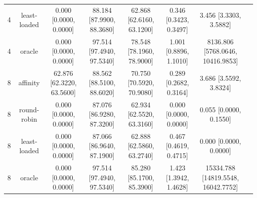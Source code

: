 \begin{table}[t]
\begin{tabular}{lccccccc}
4 & least-loaded & 0.000 \tiny [0.0000, 0.0000] & 88.184 \tiny [87.9900, 88.3680] & 62.868 \tiny [62.6160, 63.1200] & 0.346 \tiny [0.3423, 0.3497] & 3.456 \tiny [3.3303, 3.5882] \\
4 & oracle & 0.000 \tiny [0.0000, 0.0000] & 97.514 \tiny [97.4940, 97.5340] & 78.548 \tiny [78.1960, 78.9000] & 1.001 \tiny [0.8896, 1.1010] & 8136.806 \tiny [5768.0646, 10416.9853] \\
8 & affinity & 62.876 \tiny [62.3220, 63.5600] & 88.562 \tiny [88.5100, 88.6020] & 70.750 \tiny [70.5920, 70.9080] & 0.289 \tiny [0.2682, 0.3164] & 3.686 \tiny [3.5592, 3.8324] \\
8 & round-robin & 0.000 \tiny [0.0000, 0.0000] & 87.076 \tiny [86.9280, 87.3200] & 62.934 \tiny [62.5520, 63.3160] & 0.000 \tiny [0.0000, 0.0000] & 0.055 \tiny [0.0000, 0.1550] \\
8 & least-loaded & 0.000 \tiny [0.0000, 0.0000] & 87.066 \tiny [86.9640, 87.1900] & 62.888 \tiny [62.5860, 63.2740] & 0.467 \tiny [0.4619, 0.4715] & 0.000 \tiny [0.0000, 0.0000] \\
8 & oracle & 0.000 \tiny [0.0000, 0.0000] & 97.514 \tiny [97.4940, 97.5340] & 85.280 \tiny [85.1700, 85.3900] & 1.423 \tiny [1.3942, 1.4628] & 15334.788 \tiny [14819.5548, 16042.7752] \\
\bottomrule
\end{tabular}
\end{table}

